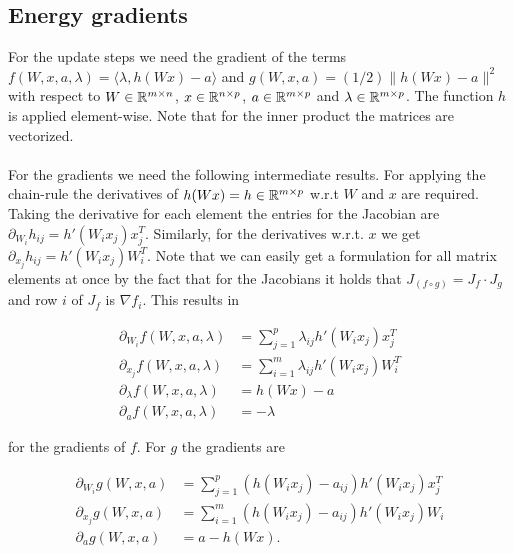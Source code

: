 \documentclass[english,11pt,a4paper]{article}
\newcommand\inner[2]{\langle #1, #2 \rangle}
\begin{document}
\subsection{Energy gradients}

For the update steps we need the gradient of the terms $f(W,x,a,\lambda) = \inner{\lambda}{h(Wx)-a}$ and $g(W,x,a) = (1/2) \| h(Wx) - a \|^2$ with respect to $W \in \mathbb{R}^{m \times n}$, $x \in \mathbb{R}^{n \times p}$, $a \in \mathbb{R}^{m \times p}$ and $\lambda \in \mathbb{R}^{m \times p}$. The function $h$ is applied element-wise. Note that for the inner product the matrices are vectorized. \\ \\
For the gradients we need the following intermediate results. For applying the chain-rule the derivatives of $h(Wx) = h \in \mathbb{R}^{m \times p}$ w.r.t $W$ and $x$ are required. Taking the derivative for each element the entries for the Jacobian are $\partial_{W_i}h_{ij} = h'(W_i x_j) x_j^T$. Similarly, for the derivatives w.r.t. $x$ we get $\partial_{x_j}h_{ij} = h'(W_i x_j) W_i^T $. Note that we can easily get a formulation for all matrix elements at once by the fact that for the Jacobians it holds that $J_{(f \circ g)} = J_f \cdot J_g$ and row $i$ of $J_f$ is $\nabla f_i$. This results in

\begin{equation}
	\begin{aligned}
		\partial_{W_i} f(W,x,a,\lambda) &= \sum_{j=1}^{p} \lambda_{ij} h'(W_i x_j) x_j^T \\
		\partial_{x_j} f(W,x,a,\lambda) &= \sum_{i=1}^{m} \lambda_{ij} h'(W_i x_j) W_i^T \\
		\partial_{\lambda} f(W,x,a,\lambda) &= h(W x) - a \\
		\partial_{a} f(W,x,a,\lambda) &= -\lambda
	\end{aligned}
\end{equation}

for the gradients of $f$. For $g$ the gradients are

\begin{equation}
	\begin{aligned}
		\partial_{W_i} g(W,x,a) &= \sum_{j=1}^{p} (h(W_i x_j) - a_{ij}) h'(W_i x_j) x_j^T \\
		\partial_{x_j} g(W,x,a) &= \sum_{i=1}^{m} (h(W_i x_j) - a_{ij}) h'(W_i x_j) W_i \\		
		\partial_{a} g(W,x,a) &= a - h(Wx). \\
	\end{aligned}
\end{equation}
\end{document}
